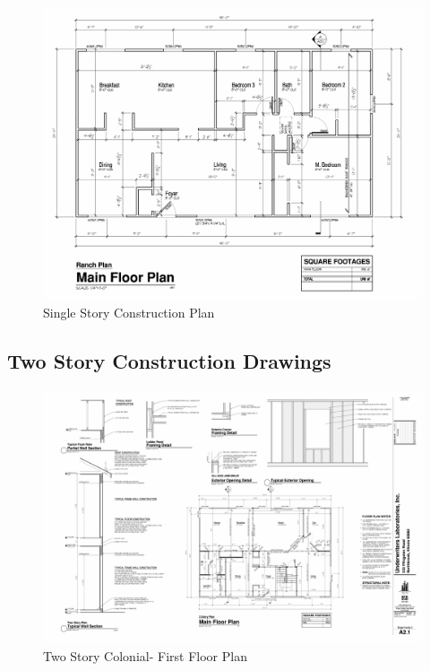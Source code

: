 \documentclass{article}
\begin{document}
\begin{appendices}
\begin{figure}
	\centering
	\includegraphics[width = 6.25in]{0_Images/Construction_Drawings/Ranch_Floor_Plan.pdf}
	\caption{Single Story Construction Plan}
\end{figure}

\clearpage

\subsection{Two Story Construction Drawings}

\begin{figure}
	\includegraphics[width=6.25in]{0_Images/Construction_Drawings/2_Story_Floor_Plan.pdf}
	\caption{Two Story Colonial- First Floor Plan}
\end{figure}


\end{appendices}
\end{document}
